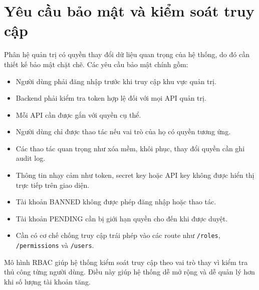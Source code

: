 \section{Yêu cầu bảo mật và kiểm soát truy cập}

Phân hệ quản trị có quyền thay đổi dữ liệu quan trọng của hệ thống, do đó cần thiết kế bảo mật chặt chẽ. Các yêu cầu bảo mật chính gồm:

\begin{itemize}
    \item Người dùng phải đăng nhập trước khi truy cập khu vực quản trị.
    \item Backend phải kiểm tra token hợp lệ đối với mọi API quản trị.
    \item Mỗi API cần được gắn với quyền cụ thể.
    \item Người dùng chỉ được thao tác nếu vai trò của họ có quyền tương ứng.
    \item Các thao tác quan trọng như xóa mềm, khôi phục, thay đổi quyền cần ghi audit log.
    \item Thông tin nhạy cảm như token, secret key hoặc API key không được hiển thị trực tiếp trên giao diện.
    \item Tài khoản BANNED không được phép đăng nhập hoặc thao tác.
    \item Tài khoản PENDING cần bị giới hạn quyền cho đến khi được duyệt.
    \item Cần có cơ chế chống truy cập trái phép vào các route như \texttt{/roles}, \texttt{/permissions} và \texttt{/users}.
\end{itemize}

Mô hình RBAC giúp hệ thống kiểm soát truy cập theo vai trò thay vì kiểm tra thủ công từng người dùng. Điều này giúp hệ thống dễ mở rộng và dễ quản lý hơn khi số lượng tài khoản tăng.
